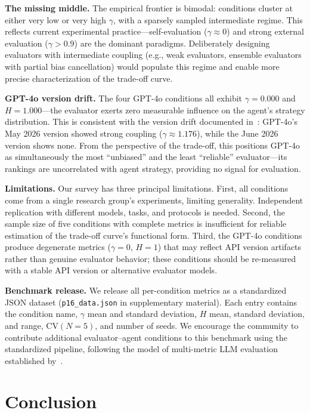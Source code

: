 \documentclass[11pt]{article}
\begin{document}
\textbf{The missing middle.} The empirical frontier is bimodal: conditions cluster at either very low or very high $\gamma$, with a sparsely sampled intermediate regime. This reflects current experimental practice---self-evaluation ($\gamma \approx 0$) and strong external evaluation ($\gamma > 0.9$) are the dominant paradigms. Deliberately designing evaluators with intermediate coupling (e.g., weak evaluators, ensemble evaluators with partial bias cancellation) would populate this regime and enable more precise characterization of the trade-off curve.

\textbf{GPT-4o version drift.} The four GPT-4o conditions all exhibit $\gamma = 0.000$ and $H = 1.000$---the evaluator exerts zero measurable influence on the agent's strategy distribution. This is consistent with the version drift documented in~\cite{liu2026mmepc}: GPT-4o's May 2026 version showed strong coupling ($\gamma \approx 1.176$), while the June 2026 version shows none. From the perspective of the trade-off, this positions GPT-4o as simultaneously the most ``unbiased'' and the least ``reliable'' evaluator---its rankings are uncorrelated with agent strategy, providing no signal for evaluation.

\textbf{Limitations.} Our survey has three principal limitations. First, all conditions come from a single research group's experiments, limiting generality. Independent replication with different models, tasks, and protocols is needed. Second, the sample size of five conditions with complete metrics is insufficient for reliable estimation of the trade-off curve's functional form. Third, the GPT-4o conditions produce degenerate metrics ($\gamma = 0$, $H = 1$) that may reflect API version artifacts rather than genuine evaluator behavior; these conditions should be re-measured with a stable API version or alternative evaluator models.

\textbf{Benchmark release.} We release all per-condition metrics as a standardized JSON dataset (\texttt{p16\_data.json} in supplementary material). Each entry contains the condition name, $\gamma$ mean and standard deviation, $H$ mean, standard deviation, and range, CV$(N{=}5)$, and number of seeds. We encourage the community to contribute additional evaluator--agent conditions to this benchmark using the standardized pipeline, following the model of multi-metric LLM evaluation established by~\cite{liang2023helm}.

\section{Conclusion}
\end{document}
